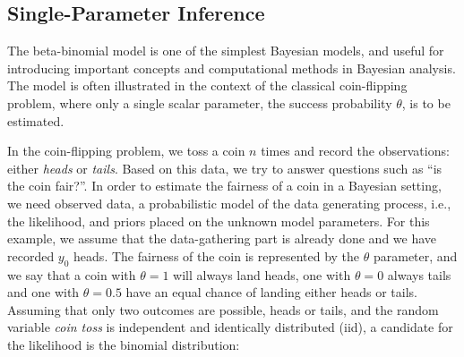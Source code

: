 
\subsection{Single-Parameter Inference}\label{sec:coin_flipping}

The beta-binomial model is one of the simplest Bayesian models, and useful for introducing important concepts and computational methods in Bayesian analysis. The model is often illustrated in the context of the classical coin-flipping problem, where only a single scalar parameter, the success probability $\theta$, is to be estimated. 

In the coin-flipping problem, we toss a coin $n$ times and record the observations: either \textit{heads} or \textit{tails}. Based on this data, we try to answer questions such as “is the coin fair?”. In order to estimate the fairness of a coin in a Bayesian setting, we need observed data, a probabilistic model of the data generating process, i.e., the likelihood, and priors placed on the unknown model parameters. For this example, we assume that the data-gathering part is already done and we have recorded $y_0$ heads. The fairness of the coin is represented by the $\theta$ parameter, and we say that a coin with $\theta=1$ will always land heads, one with $\theta=0$ always tails and one with $\theta=0.5$ have an equal chance of landing either heads or tails. Assuming that only two outcomes are possible, heads or tails, and the random variable \textit{coin toss} is independent and identically distributed (iid), a candidate for the likelihood is the binomial distribution: 

